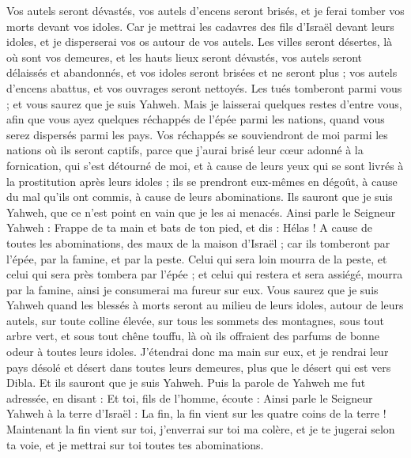 \begin{multicols}{2}
Vos autels seront dévastés, vos autels d'encens seront brisés, et je ferai tomber vos morts devant vos idoles.
Car je mettrai les cadavres des fils d'Israël devant leurs idoles, et je disperserai vos os autour de vos autels.
Les villes seront désertes, là où sont vos demeures, et les hauts lieux seront dévastés, vos autels seront délaissés et abandonnés, et vos idoles seront brisées et ne seront plus ; vos autels d'encens abattus, et vos ouvrages seront nettoyés.
Les tués tomberont parmi vous ; et vous saurez que je suis Yahweh.
Mais je laisserai quelques restes d'entre vous, afin que vous ayez quelques réchappés de l'épée parmi les nations, quand vous serez dispersés parmi les pays.
Vos réchappés se souviendront de moi parmi les nations où ils seront captifs, parce que j'aurai brisé leur cœur adonné à la fornication, qui s'est détourné de moi, et à cause de leurs yeux qui se sont livrés à la prostitution après leurs idoles ; ils se prendront eux-mêmes en dégoût, à cause du mal qu'ils ont commis, à cause de leurs abominations.
Ils sauront que je suis Yahweh, que ce n'est point en vain que je les ai menacés.
Ainsi parle le Seigneur Yahweh : Frappe de ta main et bats de ton pied, et dis : Hélas ! A cause de toutes les abominations, des maux de la maison d'Israël ; car ils tomberont par l'épée, par la famine, et par la peste.
Celui qui sera loin mourra de la peste, et celui qui sera près tombera par l'épée ; et celui qui restera et sera assiégé, mourra par la famine, ainsi je consumerai ma fureur sur eux.
Vous saurez que je suis Yahweh quand les blessés à morts seront au milieu de leurs idoles, autour de leurs autels, sur toute colline élevée, sur tous les sommets des montagnes, sous tout arbre vert, et sous tout chêne touffu, là où ils offraient des parfums de bonne odeur à toutes leurs idoles.
J'étendrai donc ma main sur eux, et je rendrai leur pays désolé et désert dans toutes leurs demeures, plus que le désert qui est vers Dibla. Et ils sauront que je suis Yahweh.
\VerseOne{}Puis la parole de Yahweh me fut adressée, en disant :
Et toi, fils de l'homme, écoute : Ainsi parle le Seigneur Yahweh à la terre d'Israël : La fin, la fin vient sur les quatre coins de la terre !
Maintenant la fin vient sur toi, j'enverrai sur toi ma colère, et je te jugerai selon ta voie, et je mettrai sur toi toutes tes abominations.

\end{multicols}
